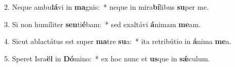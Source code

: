 2. Neque ambu\textbf{lá}vi in \textbf{ma}gnis:~*  neque in mira\textbf{bí}libus \textbf{su}per me.\

3. Si non humíliter \textbf{sen}ti\textbf{é}bam:~*  sed exaltávi \textbf{á}nimam \textbf{me}am.\

4. Sicut ablactátus est super \textbf{ma}tre \textbf{su}a:~*  ita retribútio in \textbf{á}nima \textbf{me}a.\

5. Speret Isra\textbf{ël} in \textbf{Dó}mino:~*  ex hoc nunc et \textbf{us}que in \textbf{sǽ}culum.\

